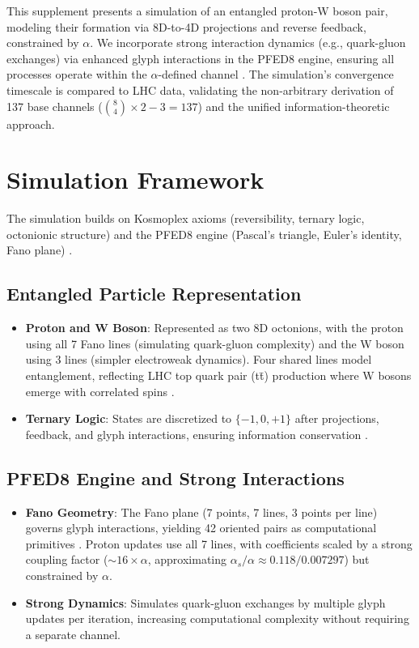 \documentclass[12pt]{article}
\theoremstyle{definition}
\begin{document}
This supplement presents a simulation of an entangled proton-W boson pair, modeling their formation via 8D-to-4D projections and reverse feedback, constrained by $\alpha$. We incorporate strong interaction dynamics (e.g., quark-gluon exchanges) via enhanced glyph interactions in the PFED8 engine, ensuring all processes operate within the $\alpha$-defined channel \citep{macedonia2025supplementA}. The simulation’s convergence timescale is compared to LHC data, validating the non-arbitrary derivation of 137 base channels ($\binom{8}{4} \times 2 - 3 = 137$) and the unified information-theoretic approach.

\section{Simulation Framework}
The simulation builds on Kosmoplex axioms (reversibility, ternary logic, octonionic structure) and the PFED8 engine (Pascal’s triangle, Euler’s identity, Fano plane) \citep{macedonia2025primer, macedonia2025supplementA}.

\subsection{Entangled Particle Representation}
\begin{itemize}
    \item \textbf{Proton and W Boson}: Represented as two 8D octonions, with the proton using all 7 Fano lines (simulating quark-gluon complexity) and the W boson using 3 lines (simpler electroweak dynamics). Four shared lines model entanglement, reflecting LHC top quark pair (tt̄) production where W bosons emerge with correlated spins \citep{atlas2022ttbar}.
    \item \textbf{Ternary Logic}: States are discretized to $\{-1, 0, +1\}$ after projections, feedback, and glyph interactions, ensuring information conservation \citep{macedonia2025primer}.
\end{itemize}

\subsection{PFED8 Engine and Strong Interactions}
\begin{itemize}
    \item \textbf{Fano Geometry}: The Fano plane (7 points, 7 lines, 3 points per line) governs glyph interactions, yielding 42 oriented pairs as computational primitives \citep{macedonia2025supplementA}. Proton updates use all 7 lines, with coefficients scaled by a strong coupling factor ($\sim 16 \times \alpha$, approximating $\alpha_s/\alpha \approx 0.118/0.007297$) but constrained by $\alpha$.
    \item \textbf{Strong Dynamics}: Simulates quark-gluon exchanges by multiple glyph updates per iteration, increasing computational complexity without requiring a separate channel.
\end{itemize}
\end{document}

